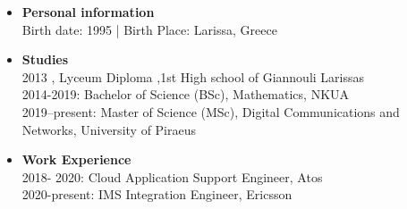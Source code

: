 \large
{}
\normalsize

\begin{itemize}

\item
{\bf Personal information}\\
Birth date: 1995 | Birth Place: Larissa, Greece

\item
{\bf Studies}\\
2013 , Lyceum Diploma ,1st High school of Giannouli Larissas\\
2014-2019: Bachelor of Science (BSc), Mathematics, NKUA\\
2019--present: Master of Science (MSc), Digital Communications and Networks, University of Piraeus

\item
{\bf Work Experience}\\
2018- 2020: Cloud Application Support Engineer, Atos\\
2020-present: IMS Integration Engineer, Ericsson


\end{itemize}

